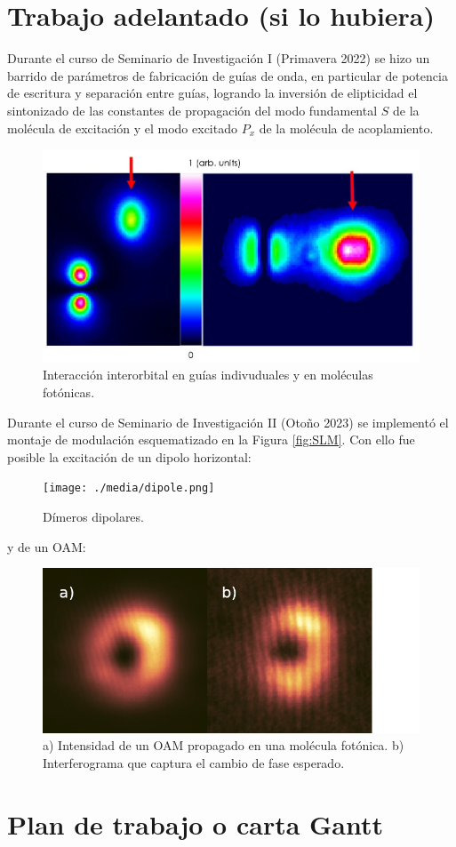 \documentclass{article}
\begin{document}
\section{Trabajo adelantado (si lo hubiera)}

Durante el curso de Seminario de Investigación I (Primavera 2022) se hizo un barrido de parámetros de fabricación de guías de onda, en particular de potencia de escritura y separación entre guías, logrando la inversión de elipticidad el sintonizado de las constantes de propagación del modo fundamental $S$ de la molécula de excitación y el modo excitado $P_x$ de la molécula de acoplamiento.


\begin{figure}[H]
	\centering
	\includegraphics[width=0.5\linewidth]{./media/SPinteraction.jpg}
	\caption{Interacción interorbital en guías indivuduales y en moléculas fotónicas.}
\end{figure}

Durante el curso de Seminario de Investigación II (Otoño 2023) se implementó el montaje de modulación esquematizado en la Figura \ref{fig:SLM}. Con ello fue posible la excitación de un dipolo horizontal:

\begin{figure}[H]
	\centering
	\texttt{[image: ./media/dipole.png]}
	\caption{Dímeros dipolares.}
\end{figure}

y de un OAM:

\begin{figure}[H]
	\centering
	\includegraphics[width=0.5\linewidth]{./media/vortex.png}
	\caption{a) Intensidad de un OAM propagado en una molécula fotónica. b) Interferograma que captura el cambio de fase esperado.}
\end{figure}

\section{Plan de trabajo o carta Gantt}


\renewcommand\refname{Referencias}


\end{document}
